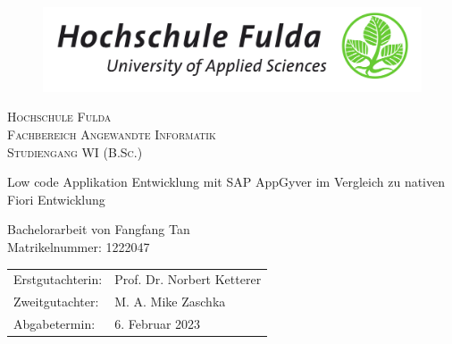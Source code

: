 

\begin{titlepage}

\begin{figure} [t!]
    \centering
    \includegraphics[width=0.75\columnwidth]{Bilder/HSFuldaLogo}
    \vspace{0.8cm}
\end{figure}

\begin{center}
  \linespread{1.3}\scshape
  \LARGE{Hochschule Fulda}\\
  \Large{Fachbereich Angewandte Informatik \\
             Studiengang WI (B.Sc.)}
\end{center}

\vspace{1.3cm}

\begin{center}
\huge\sffamily Low code Applikation Entwicklung mit SAP AppGyver im Vergleich zu nativen Fiori Entwicklung
\end{center}

\vspace{1.2cm}
  
\begin{center}
\sffamily\linespread{1.3}
  \LARGE{Bachelorarbeit von Fangfang Tan}\\
  \Large{Matrikelnummer: 1222047}
\end{center}

\vspace{1.7cm}
  
\begin{center}
\sffamily\large
    \begin{tabular}{ll}
      Erstgutachterin: & Prof. Dr. Norbert Ketterer \\
      Zweitgutachter: & M. A. Mike Zaschka \\
      Abgabetermin: & 6. Februar 2023
    \end{tabular}
\end{center}


\end{titlepage}
